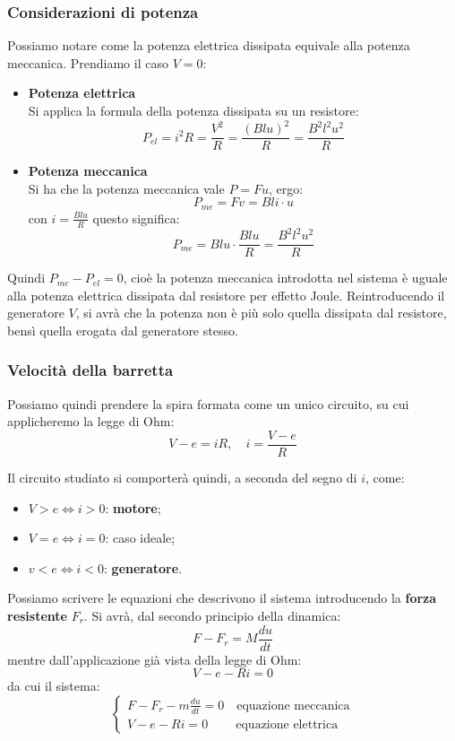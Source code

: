 \documentclass[a4paper,11pt]{article}
\begin{document}
\subsubsection{Considerazioni di potenza}
Possiamo notare come la potenza elettrica dissipata equivale alla potenza meccanica.
Prendiamo il caso $V = 0$:
\begin{itemize}
	\item \textbf{\textsf{Potenza elettrica}} \\ 
		Si applica la formula della potenza dissipata su un resistore:
		$$
		P_{el} = i^2 R = \frac{V^2}{R} = \frac{(Blu)^2}{R} = \frac{B^2 l^2 u^2}{R}
		$$
	\item \textbf{\textsf{Potenza meccanica}} \\ 
		Si ha che la potenza meccanica vale $P = F u$, ergo:
		$$
		P_{me} = Fv = Bli \cdot u 
		$$
		con $i = \frac{Blu}{R}$ questo significa:
		$$
		P_{me} = Blu \cdot \frac{Blu}{R} = \frac{B^2 l^2 u^2}{R}
		$$
\end{itemize}

Quindi $P_{me} - P_{el} = 0$, cioè la potenza meccanica introdotta nel sistema è uguale alla potenza elettrica dissipata dal resistore per effetto Joule.
Reintroducendo il generatore $V$, si avrà che la potenza non è più solo quella dissipata dal resistore, bensì quella erogata dal generatore stesso. 

\subsubsection{Velocità della barretta}
Possiamo quindi prendere la spira formata come un unico circuito, su cui applicheremo la legge di Ohm:
$$
V - e = i R, \quad i = \frac{V - e}{R}
$$

Il circuito studiato si comporterà quindi, a seconda del segno di $i$, come:
\begin{itemize}
	\item $V > e \Leftrightarrow i > 0$: \textbf{motore};
	\item $V = e \Leftrightarrow i = 0$: caso ideale;
	\item $v < e \Leftrightarrow i < 0$: \textbf{generatore}.
\end{itemize}

Possiamo scrivere le equazioni che descrivono il sistema introducendo la \textbf{forza resistente} $F_r$.
Si avrà, dal secondo principio della dinamica:
$$
F - F_r = M\frac{du}{dt}
$$
mentre dall'applicazione già vista della legge di Ohm:
$$
V - e - Ri = 0
$$
da cui il sistema:
\[
	\begin{cases}
		F - F_r - m \frac{du}{dt} = 0 \quad \text{equazione meccanica} \\
		V - e - Ri = 0 \quad \quad \ \text{equazione elettrica} 
	\end{cases}
\]
\end{document}

